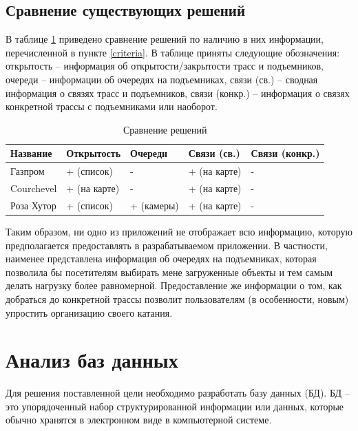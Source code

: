 \subsection{Сравнение существующих решений}

В таблице \ref{tbl:2} приведено сравнение решений по наличию в них информации, перечисленной в пункте \ref{criteria}. В таблице приняты следующие обозначения: открытость -- информация об открытости/закрытости трасс и подъемников, очереди -- информации об очередях на подъемниках, связи (св.) -- сводная информация о связях трасс и подъемников, связи (конкр.) -- информация о связях конкретной трассы с подъемниками или наоборот.

\captionsetup{justification=raggedleft,singlelinecheck=off}
\begin{table}[H]
	\centering
	\caption{Сравнение решений}
	\label{tbl:2}
	\begin{tabular}{|l|l|l|l|l|}
		\hline
		Название & Открытость & Очереди  & Связи (св.) & Связи (конкр.) \\ \hline
		Газпром & + (список) & - & + (на карте) & - \\ \hline
		Courchevel & + (на карте) & - & + (на карте) & - \\ \hline
		Роза Хутор & + (список) & + (камеры) & + (на карте) & - \\ \hline
	\end{tabular}
\end{table}

Таким образом, ни одно из приложений не отображает всю информацию, которую предполагается предоставлять в разрабатываемом приложении. В частности, наименее представлена информация об очередях на подъемниках, которая позволила бы посетителям выбирать мене загруженные объекты и тем самым делать нагрузку более равномерной. Предоставление же информации о том, как добраться до конкретной трассы позволит пользователям (в особенности, новым) упростить организацию своего катания.








\section{Анализ баз данных} 

Для решения поставленной цели необходимо разработать базу данных (БД). БД -- это упорядоченный набор структурированной информации или данных, которые обычно хранятся в электронном виде в компьютерной системе\cite{database}.

